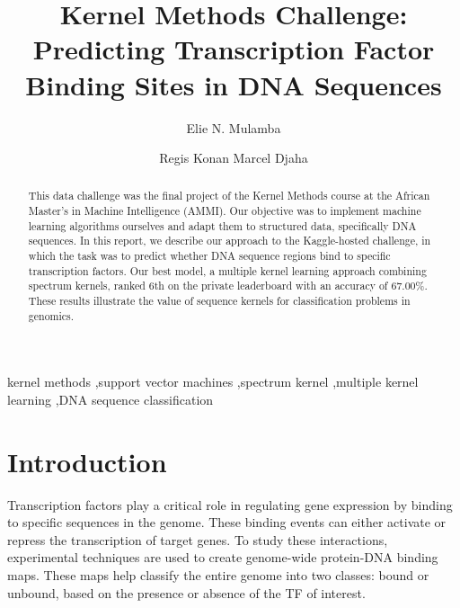 \documentclass[times,5p, twocolumn]{elsarticle}
\begin{document}
\begin{frontmatter}
\title{Kernel Methods Challenge:\\ Predicting Transcription Factor Binding Sites in DNA Sequences}

\author{Elie N. Mulamba}


\author{Regis Konan Marcel Djaha}

\address{African Master's in Machine Intelligence (AMMI), AIMS Senegal}



\begin{abstract}
This data challenge was the final project of the Kernel Methods course at the African Master's in Machine Intelligence (AMMI). Our objective was to implement machine learning algorithms ourselves and adapt them to structured data, specifically DNA sequences. In this report, we describe our approach to the Kaggle-hosted challenge, in which the task was to predict whether DNA sequence regions bind to specific transcription factors. Our best model, a multiple kernel learning approach combining spectrum kernels, ranked 6th on the private leaderboard with an accuracy of 67.00\%. These results illustrate the value of sequence kernels for classification problems in genomics.

\end{abstract}
\begin{keyword}
kernel methods \sep support vector machines \sep spectrum kernel \sep multiple kernel learning \sep DNA sequence classification
\end{keyword}
\end{frontmatter}

\section{Introduction}
\noindent
Transcription factors play a critical role in regulating gene expression by binding to specific sequences in the genome. These binding events can either activate or repress the transcription of target genes. To study these interactions, experimental techniques are used to create genome-wide protein-DNA binding maps. These maps help classify the entire genome into two classes: bound or unbound, based on the presence or absence of the TF of interest.
\end{document}
